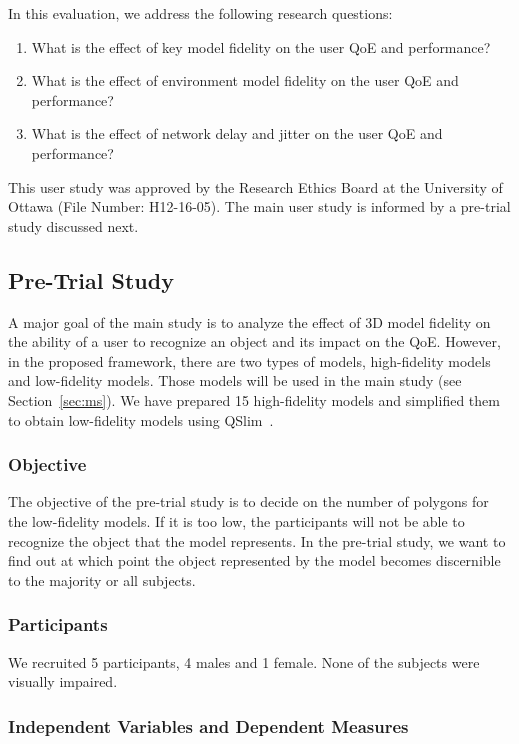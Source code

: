 In this evaluation, we address the following research questions:
\begin{enumerate}
\item
What is the effect of key model fidelity on the user QoE and performance?
\item
What is the effect of environment model fidelity on the user QoE and performance?
\item
What is the effect of network delay and jitter on the user QoE and performance?
\end{enumerate}

This user study was approved by the Research Ethics Board at the University of Ottawa (File Number: H12-16-05).
The main user study is informed by a pre-trial study discussed next.

\subsection{Pre-Trial Study}
\label{sec:pts}

A major goal of the main study is to analyze the effect of 3D model fidelity on the ability of a user to recognize an object and its impact on the QoE. However, in the proposed framework, there are two types of models, high-fidelity models and low-fidelity models. Those models will be used in the main study (see Section~\ref{sec:ms}). We have prepared 15 high-fidelity models and simplified them to obtain low-fidelity models using QSlim~\cite{garland1997}.

\subsubsection{Objective}

The objective of the pre-trial study is to decide on the number of polygons for the low-fidelity models. If it is too low, the participants will not be able to recognize the object that the model represents. In the pre-trial study, we want to find out at which point the object represented by the model becomes discernible to the majority or all subjects.

\subsubsection{Participants}

We recruited 5 participants, 4 males and 1 female. None of the subjects were visually impaired.

\subsubsection{Independent Variables and Dependent Measures}
\label{sec:ivdm}

